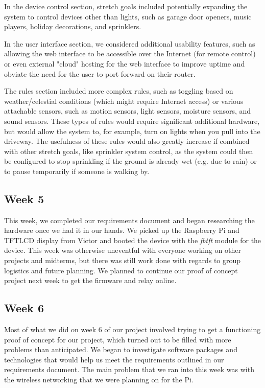 \documentclass[letterpaper,10pt]{article}
\begin{document}
In the device control section, stretch goals included potentially expanding the
system to control devices other than lights, such as garage door openers, music
players, holiday decorations, and sprinklers.

In the user interface section, we considered additional usability features,
such as allowing the web interface to be accessible over the Internet (for
remote control) or even external "cloud" hosting for the web interface to
improve uptime and obviate the need for the user to port forward on their
router.

The rules section included more complex rules, such as toggling based on
weather/celestial conditions (which might require Internet access) or various
attachable sensors, such as motion sensors, light sensors, moisture sensors,
and sound sensors.  These types of rules would require significant additional
hardware, but would allow the system to, for example, turn on lights when you
pull into the driveway.  The usefulness of these rules would also greatly
increase if combined with other stretch goals, like sprinkler system control,
as the system could then be configured to stop sprinkling if the ground is
already wet (e.g. due to rain) or to pause temporarily if someone is walking
by.

\subsection{Week 5}

This week, we completed our requirements document and began researching the
hardware once we had it in our hands. We picked up the Raspberry Pi and TFTLCD
display from Victor and booted the device with the \textit{fbtft} module for
the device. This week was otherwise uneventful with everyone working on other
projects and midterms, but there was still work done with regards to group
logistics and future planning. We planned to continue our proof of concept
project next week to get the firmware and relay online.

\subsection{Week 6}
 
Most of what we did on week 6 of our project involved trying to get a
functioning proof of concept for our project, which turned out to be filled
with more problems than anticipated. We began to investigate software packages
and technologies that would help us meet the requirements outlined in our
requirements document. The main problem that we ran into this week was with the
wireless networking that we were planning on for the Pi.
\end{document}
